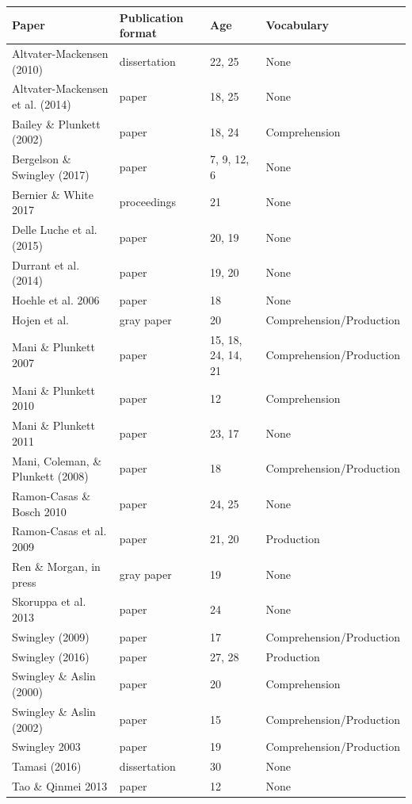 \documentclass[man]{apa6}
\theoremstyle{definition}
\theoremstyle{definition}
\theoremstyle{definition}
\theoremstyle{remark}
\begin{document}
\begin{tabular}{l|l|l|l}
\hline
Paper & Publication format & Age & Vocabulary\\
\hline
Altvater-Mackensen (2010) & dissertation & 22, 25 & None\\
\hline
Altvater-Mackensen et al. (2014) & paper & 18, 25 & None\\
\hline
Bailey \& Plunkett (2002) & paper & 18, 24 & Comprehension\\
\hline
Bergelson \& Swingley (2017) & paper & 7, 9, 12, 6 & None\\
\hline
Bernier \& White 2017 & proceedings & 21 & None\\
\hline
Delle Luche et al. (2015) & paper & 20, 19 & None\\
\hline
Durrant et al. (2014) & paper & 19, 20 & None\\
\hline
Hoehle et al. 2006 & paper & 18 & None\\
\hline
Hojen et al. & gray paper & 20 & Comprehension/Production\\
\hline
Mani \& Plunkett 2007 & paper & 15, 18, 24, 14, 21 & Comprehension/Production\\
\hline
Mani \& Plunkett 2010 & paper & 12 & Comprehension\\
\hline
Mani \& Plunkett 2011 & paper & 23, 17 & None\\
\hline
Mani, Coleman, \& Plunkett (2008) & paper & 18 & Comprehension/Production\\
\hline
Ramon-Casas \& Bosch 2010 & paper & 24, 25 & None\\
\hline
Ramon-Casas et al. 2009 & paper & 21, 20 & Production\\
\hline
Ren \& Morgan, in press & gray paper & 19 & None\\
\hline
Skoruppa et al. 2013 & paper & 24 & None\\
\hline
Swingley (2009) & paper & 17 & Comprehension/Production\\
\hline
Swingley (2016) & paper & 27, 28 & Production\\
\hline
Swingley \& Aslin (2000) & paper & 20 & Comprehension\\
\hline
Swingley \& Aslin (2002) & paper & 15 & Comprehension/Production\\
\hline
Swingley 2003 & paper & 19 & Comprehension/Production\\
\hline
Tamasi (2016) & dissertation & 30 & None\\
\hline
Tao \& Qinmei 2013 & paper & 12 & None\\

\end{tabular}
\end{document}
